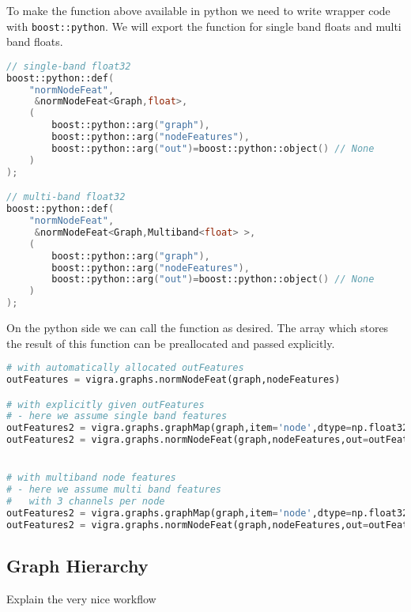 \begin{minipage}{\textwidth}
To make the function above available in python
we need to write wrapper code with \lstinline{boost::python}.
We will export the function for single band floats and multi band floats.

\begin{lstlisting}[language=c++]
// single-band float32
boost::python::def(
    "normNodeFeat",
     &normNodeFeat<Graph,float>,
    (
        boost::python::arg("graph"),
        boost::python::arg("nodeFeatures"),
        boost::python::arg("out")=boost::python::object() // None
    )
);

// multi-band float32
boost::python::def(
    "normNodeFeat",
     &normNodeFeat<Graph,Multiband<float> >,
    (
        boost::python::arg("graph"),
        boost::python::arg("nodeFeatures"),
        boost::python::arg("out")=boost::python::object() // None
    )
);
\end{lstlisting}

\end{minipage}


On the python side we can call the function as desired.
The array which stores the result of this
function can be preallocated and passed explicitly.

\begin{minipage}{\textwidth}\vspace{-0.75cm}\begin{lstlisting}[language=Python]
# with automatically allocated outFeatures
outFeatures = vigra.graphs.normNodeFeat(graph,nodeFeatures)

# with explicitly given outFeatures
# - here we assume single band features
outFeatures2 = vigra.graphs.graphMap(graph,item='node',dtype=np.float32)
outFeatures2 = vigra.graphs.normNodeFeat(graph,nodeFeatures,out=outFeatures2)


# with multiband node features 
# - here we assume multi band features
#   with 3 channels per node
outFeatures2 = vigra.graphs.graphMap(graph,item='node',dtype=np.float32,channels=3)
outFeatures2 = vigra.graphs.normNodeFeat(graph,nodeFeatures,out=outFeatures2)
\end{lstlisting}\end{minipage}\vspace{0.5cm}



\subsection{Graph Hierarchy}
    
Explain the very nice workflow 